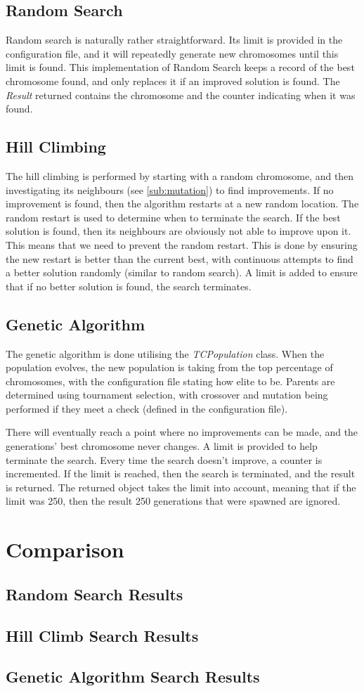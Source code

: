 \documentclass[11pt, a4paper]{article}
\begin{document}
\subsection{Random Search}
\label{sub:random_search}
Random search is naturally rather straightforward. Its limit is provided in the
configuration file, and it will repeatedly generate new chromosomes until this
limit is found. This implementation of Random Search keeps a record of the best
chromosome found, and only replaces it if an improved solution is found. The
\emph{Result} returned contains the chromosome and the counter indicating when
it was found.

\subsection{Hill Climbing}
\label{sub:hill_climbing}
The hill climbing is performed by starting with a random chromosome, and then
investigating its neighbours (see \ref{sub:mutation}) to find improvements. If
no improvement is found, then the algorithm restarts at a new random location.
The random restart is used to determine when to terminate the search. If the
best solution is found, then its neighbours are obviously not able to improve
upon it. This means that we need to prevent the random restart. This is done by
ensuring the new restart is better than the current best, with continuous
attempts to find a better solution randomly (similar to random search). A limit
is added to ensure that if no better solution is found, the search terminates.

\subsection{Genetic Algorithm}
\label{sub:genetic_algorithm}
The genetic algorithm is done utilising the \emph{TCPopulation} class. When the
population evolves, the new population is taking from the top percentage of
chromosomes, with the configuration file stating how elite to be. Parents are
determined using tournament selection, with crossover and mutation being
performed if they meet a check (defined in the configuration file).

There will eventually reach a point where no improvements can be made, and the
generations' best chromosome never changes. A limit is provided to help
terminate the search. Every time the search doesn't improve, a counter is
incremented. If the limit is reached, then the search is terminated, and the
result is returned. The returned object takes the limit into account, meaning
that if the limit was 250, then the result 250 generations that were spawned are
ignored.

\newpage
\section{Comparison}
\subsection{Random Search Results}
\subsection{Hill Climb Search Results}
\subsection{Genetic Algorithm Search Results}


 
\end{document}
